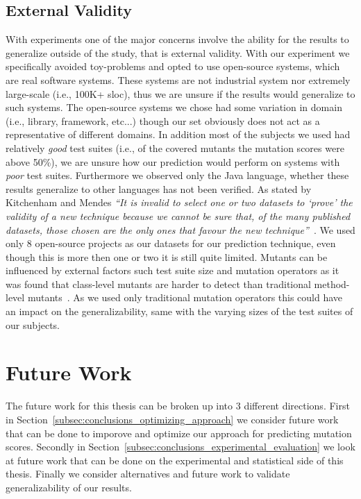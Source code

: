 \subsection{External Validity}
\label{subsec:conclusions_external_validity}
With experiments one of the major concerns involve the ability for the results to generalize outside of the study, that is external validity. With our experiment we specifically avoided toy-problems and opted to use open-source systems, which are real software systems. These systems are not industrial system nor extremely large-scale (i.e., 100K+ \gls{sloc}), thus we are unsure if the results would generalize to such systems. The open-source systems we chose had some variation in domain (i.e., library, framework, etc...) though our set obviously does not act as a representative of different domains. In addition most of the subjects we used had relatively \emph{good} test suites (i.e., of the covered mutants the mutation scores were above 50\%), we are unsure how our prediction would perform on systems with \emph{poor} test suites. Furthermore we observed only the Java language, whether these results generalize to other languages has not been verified. As stated by Kitchenham and Mendes \textit{``It is invalid to select one or two datasets to `prove' the validity of a new technique because we cannot be sure that, of the many published datasets, those chosen are the only ones that favour the new technique''}~\cite{KM09}. We used only 8 open-source projects as our datasets for our prediction technique, even though this is more then one or two it is still quite limited.  Mutants can be influenced by external factors such test suite size and mutation operators as it was found that class-level mutants are harder to detect than traditional method-level mutants~\cite{NK11}. As we used only traditional mutation operators this could have an impact on the generalizability, same with the varying sizes of the test suites of our subjects.


\section{Future Work}
\label{sec:conclusions_future_work}
The future work for this thesis can be broken up into 3 different directions. First in Section~\ref{subsec:conclusions_optimizing_approach} we consider future work that can be done to imporove and optimize our approach for predicting mutation scores. Secondly in Section~\ref{subsec:conclusions_experimental_evaluation} we look at future work that can be done on the experimental and statistical side of this thesis. Finally we consider alternatives and future work to validate generalizability of our results.


